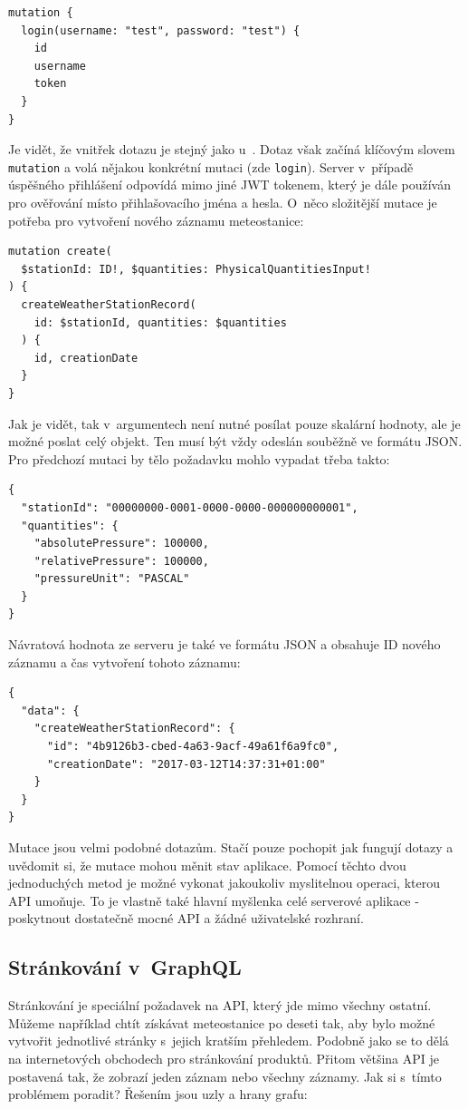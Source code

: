 \begin{verbatim}
mutation {
  login(username: "test", password: "test") {
    id
    username
    token
  }
}
\end{verbatim}

Je vidět, že vnitřek dotazu je stejný jako u~. Dotaz však začíná klíčovým slovem \texttt{mutation} a volá nějakou konkrétní mutaci (zde \texttt{login}). Server v~případě úspěšného přihlášení odpovídá mimo jiné JWT tokenem, který je dále používán pro ověřování místo přihlašovacího jména a hesla. O~něco složitější mutace je potřeba pro vytvoření nového záznamu meteostanice:

\begin{verbatim}
mutation create(
  $stationId: ID!, $quantities: PhysicalQuantitiesInput!
) {
  createWeatherStationRecord(
    id: $stationId, quantities: $quantities
  ) {
    id, creationDate
  }
}
\end{verbatim}

Jak je vidět, tak v~argumentech není nutné posílat pouze skalární hodnoty, ale je možné poslat celý objekt. Ten musí být vždy odeslán souběžně ve formátu JSON. Pro předchozí mutaci by tělo požadavku mohlo vypadat třeba takto:

\begin{verbatim}
{
  "stationId": "00000000-0001-0000-0000-000000000001",
  "quantities": {
    "absolutePressure": 100000,
    "relativePressure": 100000,
    "pressureUnit": "PASCAL"
  }
}
\end{verbatim}
%
Návratová hodnota ze serveru je také ve formátu JSON a obsahuje ID nového záznamu a čas vytvoření tohoto záznamu:
%
\begin{verbatim}
{
  "data": {
    "createWeatherStationRecord": {
      "id": "4b9126b3-cbed-4a63-9acf-49a61f6a9fc0",
      "creationDate": "2017-03-12T14:37:31+01:00"
    }
  }
}
\end{verbatim}

Mutace jsou velmi podobné dotazům. Stačí pouze pochopit jak fungují dotazy a uvědomit si, že mutace mohou měnit stav aplikace. Pomocí těchto dvou jednoduchých metod je možné vykonat jakoukoliv myslitelnou operaci, kterou API umoňuje. To je vlastně také hlavní myšlenka celé serverové aplikace - poskytnout dostatečně mocné API a žádné uživatelské rozhraní.

\subsection{Stránkování v~GraphQL}
Stránkování je speciální požadavek na API, který jde mimo všechny ostatní. Můžeme například chtít získávat meteostanice po deseti tak, aby bylo možné vytvořit jednotlivé stránky s~jejich kratším přehledem. Podobně jako se to dělá na internetových obchodech pro stránkování produktů. Přitom většina API je postavená tak, že zobrazí jeden záznam nebo všechny záznamy. Jak si s~tímto problémem poradit? Řešením jsou uzly a hrany grafu:

